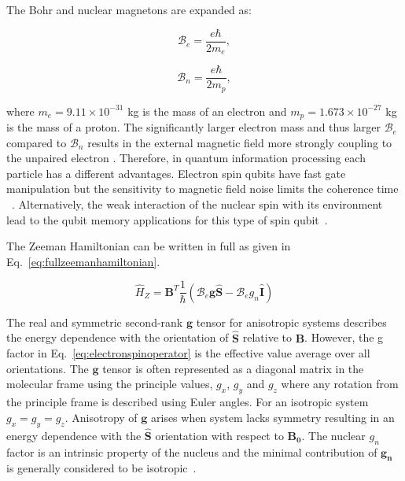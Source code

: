 The Bohr and nuclear magnetons are expanded as:

\begin{minipage}{0.4\linewidth}  
\begin{equation}
\label{eq:electronspinoperator}
\mathcal{B}_{e} = \frac{e\hbar}{2m_{e}},
\end{equation}  
\end{minipage}  
\hspace{0.5cm}  
\begin{minipage}{0.4\linewidth}  
\begin{equation}
\label{eq:nuclearspinoperator}
\mathcal{B}_{n} = \frac{e\hbar}{2m_{p}},
\end{equation}  
\end{minipage}

\noindent where $m_{e}= 9.11 \times 10^{-31}$ kg is the mass of an electron and $m_{p}=1.673 \times 10^{-27}$ kg is the mass of a proton. The significantly larger electron mass and thus larger $\mathcal{B}_{e}$ compared to $\mathcal{B}_{n}$ results in the external magnetic field more strongly coupling to the unpaired electron \citep{weil1994electron}. Therefore, in quantum information processing each particle has a different advantages. Electron spin qubits have fast gate manipulation but the sensitivity to magnetic field noise limits the coherence time ~\cite{10.1038/nature11449}. Alternatively, the weak interaction of the nuclear spin with its environment lead to the qubit memory applications for this type of spin qubit~\citep{nature12011}. 

The Zeeman Hamiltonian can be written in full as given in Eq.~\ref{eq:fullzeemanhamiltonian}. 


\begin{equation}
\label{eq:fullzeemanhamiltonian}
\hat{H}_{Z}=\textbf{B}^{T}\frac{1}{\hbar} \left (\mathcal{B}_{e}\textbf{g}\hat{\textbf{S}}-\mathcal{B}_{e} g_{n}\hat{\textbf{I}}\right )
\end{equation} 

The real and symmetric second-rank $\textbf{g}$ tensor for anisotropic systems describes the energy dependence with the orientation of $\hat{\textbf{S}}$ relative to $\textbf{B}$. However, the g factor in Eq.~\ref{eq:electronspinoperator} is the effective value average over all orientations. The $\textbf{g}$ tensor is often represented as a diagonal matrix in the molecular frame using the principle values, $g_{x}$, $g_{y}$ and $g_{z}$ where any rotation from the principle frame is described using Euler angles. For an isotropic system $g_{x}=g_{y}=g_{z}$. Anisotropy of $\bm{g}$ arises when system lacks symmetry resulting in an energy dependence with the $\hat{\bm{S}}$ orientation with respect to $\bm{B_{0}}$. The nuclear $g_{n}$ factor is an intrinsic property of the nucleus and the minimal contribution of $\bm{g_{n}}$ is generally considered to be isotropic~\citep{schweiger2001principles}. 

